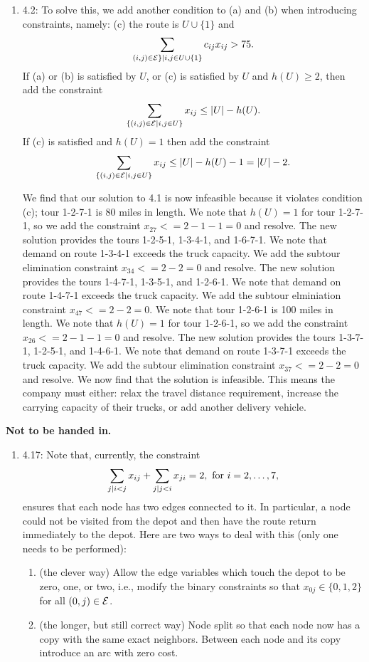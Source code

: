 \documentclass[10pt]{article}
\begin{document}
\begin{enumerate}
\item 4.2: To solve this, we add another condition to (a) and (b) when
  introducing constraints, namely: (c) the route is $U \cup \{1\}$ and
  \[
  \sum\limits_{(i,j) \in {\cal E}\}| i,j \in U \cup \{1\}} c_{ij} x_{ij} > 75.
  \]
  {If (a) or (b) is satisfied by $U$, or (c) is
    satisfied by $U$ and $h(U) \geq 2$, then add the constraint}
  \[
  \sum\limits_{\{(i,j) \in {\cal E}| i,j \in U\}} x_{ij} \leq |U| - h(U).
  \]
  {If (c) is satisfied and $h(U) = 1$ then add the constraint}
  \[
  {\sum\limits_{\{(i,j) \in {\cal E}| i,j \in U\}} x_{ij} \leq |U| - h(U) - 1 = |U|
  - 2.}
  \]

We find that our solution to 4.1 is now infeasible because it violates condition (c); tour 1-2-7-1 is 80 miles in length.  We note that $h(U) = 1$ for tour 1-2-7-1, so we add the constraint $x_{27} <= 2-1-1 = 0$ and resolve.  The new solution provides the tours 1-2-5-1, 1-3-4-1, and 1-6-7-1.  We note that demand on route 1-3-4-1 exceeds the truck capacity.  We add the subtour elimination constraint $x_{34} <= 2-2 = 0$ and resolve.  The new solution provides the tours 1-4-7-1, 1-3-5-1, and 1-2-6-1.  We note that demand on route 1-4-7-1 exceeds the truck capacity.  We add the subtour elminiation constraint $x_{47} <= 2-2 = 0$.  We note that tour 1-2-6-1 is 100 miles in length.  We note that $h(U) = 1$ for tour 1-2-6-1, so we add the constraint $x_{26} <= 2-1-1 =0$ and resolve.  The new solution provides the tours 1-3-7-1, 1-2-5-1, and 1-4-6-1.  We note that demand on route 1-3-7-1 exceeds the truck capacity.  We add the subtour elimination constraint $x_{37} <= 2-2 = 0$ and resolve.  We now find that the solution is infeasible.  This means the company must either:  relax the travel distance requirement, increase the carrying capacity of their trucks, or add another delivery vehicle.
\end{enumerate}

{\bf Not to be handed in.}

\medskip

\begin{enumerate}

\item 4.17: Note that, currently, the constraint
\[
\sum\limits_{j | i < j} x_{ij} + \sum\limits_{j | j < i} x_{ji} = 2, \mbox{ for } i
= 2,\ldots, 7,
\]
ensures that each node has two edges connected to it. In particular, a
node could not be visited from the depot and then have the route
return immediately to the depot. Here are two ways to deal with this
(only one needs to be performed):
\begin{enumerate}
\item (the clever way) Allow the edge variables which touch the depot
  to be zero, one, or two, i.e., modify the binary constraints so that $x_{0j} \in \{0,1,2\}$ for all $(0,j) \in {\cal E}$.
\item (the longer, but still correct way) Node split so that each node now has a copy with the same exact
  neighbors. Between each node and its copy introduce an arc with zero
  cost. 
\end{enumerate}
\end{enumerate}
  
\end{document}
